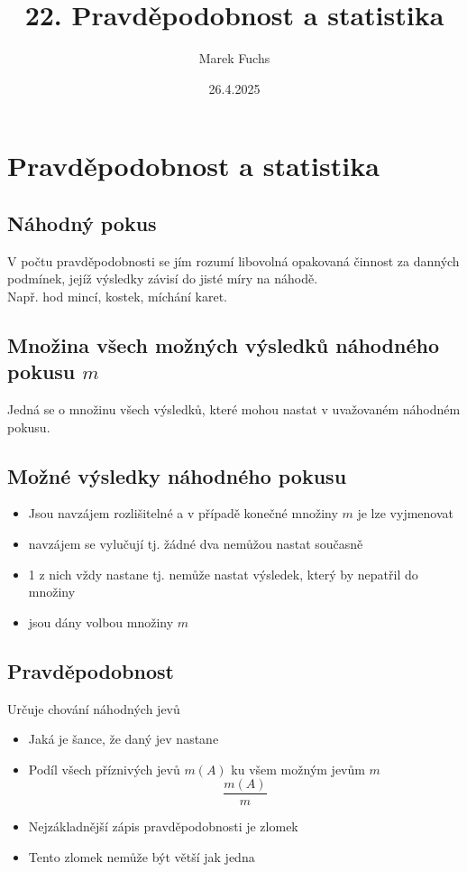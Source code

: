 \title{ 22. Pravděpodobnost a statistika}
\author{Marek Fuchs}
\date{26.4.2025}

\maketitle



\section{Pravděpodobnost a statistika}
    \subsection{Náhodný pokus}
    V počtu pravděpodobnosti se jím rozumí libovolná opakovaná činnost za danných podmínek, jejíž výsledky závisí do jisté míry na náhodě.\\
    Např. hod mincí, kostek, míchání karet.
    \subsection{Množina všech možných výsledků náhodného pokusu $m$}
    Jedná se o množinu všech výsledků, které mohou nastat v uvažovaném náhodném pokusu.
    \subsection{Možné výsledky náhodného pokusu}
    \begin{itemize}
        \item Jsou navzájem rozlišitelné a v případě konečné množiny $m$ je lze vyjmenovat
        \item navzájem se vylučují tj. žádné dva nemůžou nastat současně
        \item 1 z nich vždy nastane tj. nemůže nastat výsledek, který by nepatřil do množiny
        \item jsou dány volbou množiny $m$
    \end{itemize}
    \subsection{Pravděpodobnost}
    Určuje chování náhodných jevů
    \begin{itemize}
            \item Jaká je šance, že daný jev nastane
            \item Podíl všech příznivých jevů $m(A)$ ku všem možným jevům $m$\\
            $$
            \frac{m(A)}{m}
            $$
            \item Nejzákladnější zápis pravděpodobnosti je zlomek
            \item Tento zlomek nemůže být větší jak jedna
        \end{itemize}
